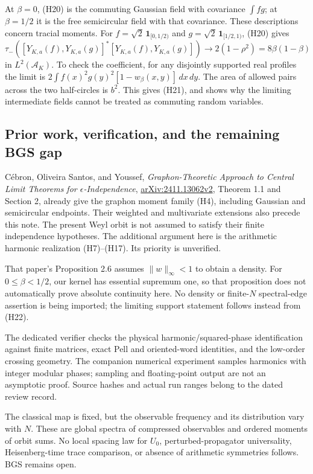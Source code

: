 At \(\beta=0\), (H20) is the commuting Gaussian field with covariance
\(\int fg\); at \(\beta=1/2\) it is the free semicircular field with that
covariance. These descriptions concern tracial moments.
For \(f=\sqrt2\,\mathbf1_{[0,1/2)}\) and
\(g=\sqrt2\,\mathbf1_{[1/2,1)}\), (H20) gives
\[
 \tau_-\!\left([Y_{K,a}(f),Y_{K,a}(g)]^*
                    [Y_{K,a}(f),Y_{K,a}(g)]\right)
 \longrightarrow 2(1-\rho^2)=8\beta(1-\beta)                 \tag{H21}
\]
in \(L^2(\mathcal A_K)\). To check the coefficient, for any disjointly supported
real profiles the limit is
\(2\int f(x)^2g(y)^2[1-w_\beta(x,y)]\,dx\,dy\).
The area of allowed pairs across the two half-circles is \(b^2\).
This gives (H21), and shows why the limiting intermediate fields cannot
be treated as commuting random variables.

\hypertarget{pell-harmonic-prior-work-verification-and-the-remaining-bgs-gap}{%
\subsection{Prior work, verification, and the remaining BGS gap}\label{pell-harmonic-prior-work-verification-and-the-remaining-bgs-gap}}

Cébron, Oliveira Santos, and Youssef,
\emph{Graphon-Theoretic Approach to Central Limit Theorems for
\(\epsilon\)-Independence}, \href{https://arxiv.org/html/2411.13062v2}{arXiv:2411.13062v2},
Theorem 1.1 and Section 2,
already give the graphon moment family (H4), including Gaussian and
semicircular endpoints. Their weighted and multivariate extensions also
precede this note. The present Weyl orbit is not assumed to satisfy their
finite independence hypotheses. The additional argument here is the
arithmetic harmonic realization (H7)--(H17). Its priority is unverified.

That paper's Proposition 2.6 assumes \(\|w\|_\infty<1\) to obtain a density.
For \(0\le\beta<1/2\), our kernel has essential supremum one, so that
proposition does not automatically prove absolute continuity here.
No density or finite-\(N\) spectral-edge assertion is being imported; the
limiting support statement follows instead from (H22).

The dedicated verifier checks the physical harmonic/squared-phase
identification against finite matrices, exact Pell and oriented-word
identities, and the low-order crossing geometry. The companion numerical
experiment samples harmonics with integer modular phases; sampling and
floating-point output are not an asymptotic proof. Source hashes and actual
run ranges belong to the dated review record.

The classical map is fixed, but the observable frequency and its distribution
vary with \(N\). These are global spectra of compressed observables and ordered
moments of orbit sums. No local spacing law for \(U_0\), perturbed-propagator
universality, Heisenberg-time trace comparison, or absence of arithmetic
symmetries follows. BGS remains open.
